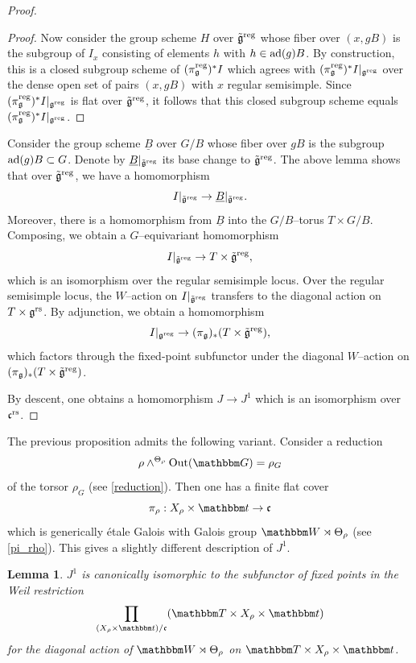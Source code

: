 \documentclass[12pt,english]{smfart}
\numberwithin{equation}{subsection}
\newtheorem{lemma}[equation]{Lemma}
\theoremstyle{remark}
\newcommand\GG{{\mathbbm G}}
\newcommand\bbW{{\mathbbm W}}
\newcommand\bbT{{\mathbbm T}}
\newcommand\bbt{{\mathbbm t}}
\newcommand\ad{{\rm ad}}
\newcommand\Out{{\rm Out}}
\newcommand\rs{{\rm rs}}
\newcommand\reg{{\rm reg}}
\begin{document}
\begin{proof}
\begin{proof}
Now consider the group scheme $H$ over $\tilde{\mathfrak{g}}^\reg$ whose fiber over $(x,gB)$ is the subgroup of $I_x$ consisting of elements $h$ with $h\in \ad(g)B$. By construction, this is a closed subgroup scheme of $(\pi_{\mathfrak{g}}^\reg)^*I$ which agrees with $(\pi_{\mathfrak{g}}^\reg)^*I|_{\mathfrak{g}^\reg}$ over the dense open set of pairs $(x,gB)$ with $x$ regular semisimple. Since $(\pi_{\mathfrak{g}}^\reg)^*I|_{\mathfrak{g}^\reg}$ is flat over $\tilde{\mathfrak{g}}^\reg$, it follows that this closed subgroup scheme equals $(\pi_{\mathfrak{g}}^\reg)^*I|_{\mathfrak{g}^\reg}$.
\end{proof}

Consider the group scheme $\underline{B}$ over $G/B$ whose fiber over $gB$ is the subgroup $\ad(g)B\subset G$. Denote by $\underline{B}|_{\tilde{\mathfrak{g}}^\reg}$ its base change to $\tilde{\mathfrak{g}}^\reg$. The above lemma shows that over $\tilde{\mathfrak{g}}^\reg$, we have a homomorphism
$$
I|_{\tilde{\mathfrak{g}}^\reg}\to \underline{B}|_{\tilde{\mathfrak{g}}^\reg}.
$$
Moreover, there is a homomorphism from $\underline{B}$ into the $G/B$--torus $T\times G/B$. Composing, we obtain a $G$--equivariant homomorphism
$$
I|_{\tilde{\mathfrak{g}}^\reg}\to T\times \tilde{\mathfrak{g}}^\reg,
$$
which is an isomorphism over the regular semisimple locus. Over the regular semisimple locus, the $W$--action on $I|_{\tilde{\mathfrak{g}}^\reg}$ transfers to the diagonal action on $T\times\mathfrak{g}^\rs$. By adjunction, we obtain a homomorphism
$$
I|_{\mathfrak{g}^\reg}\to (\pi_{\mathfrak{g}})_*(T\times\tilde{\mathfrak{g}}^\reg),
$$
which factors through the fixed-point subfunctor under the diagonal $W$--action on $(\pi_{\mathfrak{g}})_*(T\times\tilde{\mathfrak{g}}^\reg)$.

By descent, one obtains a homomorphism $J\to J^1$ which is an isomorphism over $\mathfrak{c}^\rs$.
\end{proof}

The previous proposition admits the following variant. Consider a reduction
$$\rho\wedge^{\Theta_\rho} \Out(\GG)=\rho_G$$
of the torsor $\rho_G$ (see \ref{reduction}). Then one has a finite flat cover
$$\pi_{\rho}:X_\rho\times \bbt\to \mathfrak{c}$$
which is generically \'etale Galois with Galois group $\bbW\rtimes \Theta_\rho$
(see \ref{pi_rho}). This gives a slightly different description of $J^1$.

\begin{lemma}\label{J pi_rho_G}
$J^1$ is canonically isomorphic to the subfunctor of fixed points in the Weil restriction
$$\prod_{(X_\rho\times \bbt)/\mathfrak{c}} (\bbT\times X_\rho\times \bbt)$$
for the diagonal action of $\bbW\rtimes \Theta_\rho$ on $\bbT\times X_\rho\times \bbt$.
\end{lemma}
\end{document}
